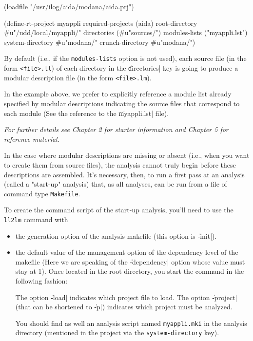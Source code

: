 \begin{Code*}
(loadfile "/usr/ilog/aida/modana/aida.prj")

(define-rt-project myappli
   required-projects (aida)
   root-directory #u"/udd/local/myappli/" 
   directories (#u"sources/")
   modules-lists ("myappli.lst")
   system-directory #u"modana/"
   crunch-directory #u"modana/")
\end{Code*}



By default (i.e., if the {\tt modules-lists} option is not used), each source file (in the form {\tt <file>.ll}) of each directory in the \|directories| key is going to produce a modular description file (in the form {\tt <file>.lm}).

In the example above, we prefer to explicitly reference a module list already specified by modular descriptions indicating the source files that correspond to each module (See the reference to the \|myappli.lst| file). 

\medskip 

{\em For further details see Chapter 2 for starter information and Chapter 5 for reference material}.


In the case where modular descriptions are missing or absent (i.e., when you want to create them from source files), the analysis cannot truly begin before these descriptions are assembled.  It's necessary, then, to run a first pass at an analysis (called a "start-up" analysis) that, as all analyses, can be run from a file of command type {\tt Makefile}.


To create the command script of the start-up analysis, you'll need to use the {\tt ll2lm} command with
\begin{itemize}
\item
the generation option of the analysis makefile (this option is \|-init|).
\item
the default value of the management option of the dependency level of the makefile (Here we are speaking of the \|-dependency| option whose value must stay at 1). 
Once located in the root directory, you start the command in the following fashion:
\begin{Code*}
\end{Code*}
The option \|-load| indicates which project file to load.  The option \|-project| (that can be shortened to \|-p|) indicates which project must be analyzed. 

You should find as well an analysis script named {\tt myappli.mki} in the analysis directory (mentioned in the project via the {\tt system-directory} key).
\end{itemize}

